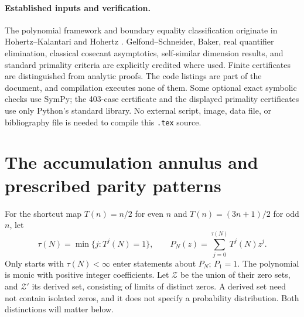 \documentclass[11pt,a4paper]{article}
\theoremstyle{definition}
\theoremstyle{remark}
\numberwithin{equation}{section}
\begin{document}
\paragraph{Established inputs and verification.}
The polynomial framework and boundary equality classification originate
in Hohertz--Kalantari and Hohertz \cite{R025,R005}.
Gelfond--Schneider, Baker, real quantifier elimination, classical
cosecant asymptotics, self-similar dimension results, and standard
primality criteria are explicitly credited where used.
Finite certificates are distinguished from analytic proofs. The
code listings are part of the document, and compilation executes
none of them. Some optional exact symbolic checks use SymPy; the
403-case certificate and the displayed primality certificates use
only Python's standard library. No external script, image, data file,
or bibliography file is needed to compile this \texttt{.tex} source.



\section{The accumulation annulus and prescribed parity patterns}
\label{C:sec:ucz}
For the shortcut map $T(n)=n/2$ for even $n$ and $T(n)=(3n+1)/2$
for odd $n$, let
\[
\tau(N)=\min\{j:T^j(N)=1\},\qquad
P_N(z)=\sum_{j=0}^{\tau(N)}T^j(N)z^j.
\]
Only starts with $\tau(N)<\infty$ enter statements about $P_N$;
$P_1=1$. The polynomial is monic with positive integer coefficients.
Let $\mathcal Z$ be the union of their zero sets, and $\mathcal Z'$
its derived set, consisting of limits of distinct zeros. A derived set
need not contain isolated zeros, and it does not specify a probability
distribution. Both distinctions will matter below.
\end{document}
